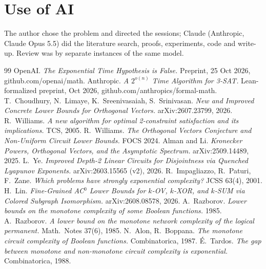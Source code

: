 \documentclass[11pt,a4paper]{article}
\theoremstyle{plain}
\theoremstyle{definition}
\theoremstyle{remark}
\begin{document}
\section*{Use of AI}
The author chose the problem and directed the sessions; Claude (Anthropic, Claude Opus 5.5) did the literature
search, proofs, experiments, code and write-up. Review was by separate instances of the same model.

\begin{thebibliography}{99}\small
{} OpenAI. \emph{The Exponential Time Hypothesis is False.} Preprint, 25 Oct 2026, github.com/openai/math.
 Anthropic. \emph{A $2^{o(n)}$ Time Algorithm for 3-SAT.} Lean-formalized preprint, Oct 2026,
  github.com/anthropics/formal-math.
 T.~Choudhury, N.~Limaye, K.~Sreenivasaiah, S.~Srinivasan. \emph{New and Improved Concrete Lower Bounds
  for Orthogonal Vectors.} arXiv:2607.23799, 2026.
 R.~Williams. \emph{A new algorithm for optimal 2-constraint satisfaction and its implications.} TCS, 2005.
 R.~Williams. \emph{The Orthogonal Vectors Conjecture and Non-Uniform Circuit Lower Bounds.} FOCS 2024.
 Alman and Li. \emph{Kronecker Powers, Orthogonal Vectors, and the Asymptotic Spectrum.} arXiv:2509.14489, 2025.
 L.~Ye. \emph{Improved Depth-2 Linear Circuits for Disjointness via Quenched Lyapunov Exponents.}
  arXiv:2603.15565 (v2), 2026.
 R.~Impagliazzo, R.~Paturi, F.~Zane. \emph{Which problems have strongly exponential complexity?} JCSS 63(4), 2001.
 H.~Lin. \emph{Fine-Grained AC$^0$ Lower Bounds for $k$-OV, $k$-XOR, and $k$-SUM via Colored Subgraph
  Isomorphism.} arXiv:2608.08578, 2026.
 A.~Razborov. \emph{Lower bounds on the monotone complexity of some Boolean functions.} 1985.
 A.~Razborov. \emph{A lower bound on the monotone network complexity of the logical permanent.}
  Math.\ Notes 37(6), 1985.
 N.~Alon, R.~Boppana. \emph{The monotone circuit complexity of Boolean functions.} Combinatorica, 1987.
 \'E.~Tardos. \emph{The gap between monotone and non-monotone circuit complexity is exponential.} Combinatorica, 1988.
\end{thebibliography}
\end{document}
